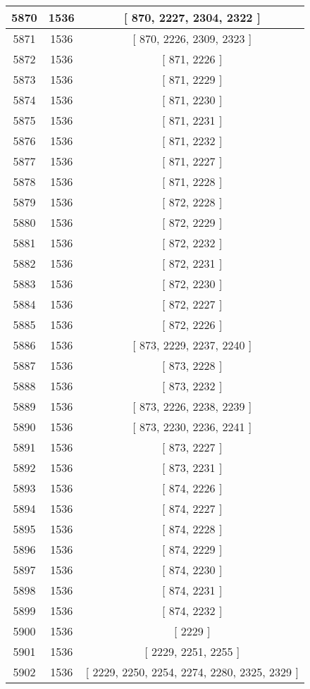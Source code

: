 \begin{center}
\begin{longtable}[H]{|| c c c ||}
\hline
5870 & 1536 & [ 870, 2227, 2304, 2322 ] \\ 
\hline
5871 & 1536 & [ 870, 2226, 2309, 2323 ] \\ 
\hline
5872 & 1536 & [ 871, 2226 ] \\ 
\hline
5873 & 1536 & [ 871, 2229 ] \\ 
\hline
5874 & 1536 & [ 871, 2230 ] \\ 
\hline
5875 & 1536 & [ 871, 2231 ] \\ 
\hline
5876 & 1536 & [ 871, 2232 ] \\ 
\hline
5877 & 1536 & [ 871, 2227 ] \\ 
\hline
5878 & 1536 & [ 871, 2228 ] \\ 
\hline
5879 & 1536 & [ 872, 2228 ] \\ 
\hline
5880 & 1536 & [ 872, 2229 ] \\ 
\hline
5881 & 1536 & [ 872, 2232 ] \\ 
\hline
5882 & 1536 & [ 872, 2231 ] \\ 
\hline
5883 & 1536 & [ 872, 2230 ] \\ 
\hline
5884 & 1536 & [ 872, 2227 ] \\ 
\hline
5885 & 1536 & [ 872, 2226 ] \\ 
\hline
5886 & 1536 & [ 873, 2229, 2237, 2240 ] \\ 
\hline
5887 & 1536 & [ 873, 2228 ] \\ 
\hline
5888 & 1536 & [ 873, 2232 ] \\ 
\hline
5889 & 1536 & [ 873, 2226, 2238, 2239 ] \\ 
\hline
5890 & 1536 & [ 873, 2230, 2236, 2241 ] \\ 
\hline
5891 & 1536 & [ 873, 2227 ] \\ 
\hline
5892 & 1536 & [ 873, 2231 ] \\ 
\hline
5893 & 1536 & [ 874, 2226 ] \\ 
\hline
5894 & 1536 & [ 874, 2227 ] \\ 
\hline
5895 & 1536 & [ 874, 2228 ] \\ 
\hline
5896 & 1536 & [ 874, 2229 ] \\ 
\hline
5897 & 1536 & [ 874, 2230 ] \\ 
\hline
5898 & 1536 & [ 874, 2231 ] \\ 
\hline
5899 & 1536 & [ 874, 2232 ] \\ 
\hline
5900 & 1536 & [ 2229 ] \\ 
\hline
5901 & 1536 & [ 2229, 2251, 2255 ] \\ 
\hline
5902 & 1536 & [ 2229, 2250, 2254, 2274, 2280, 2325, 2329 ] \\ 

\end{longtable}
\end{center}
